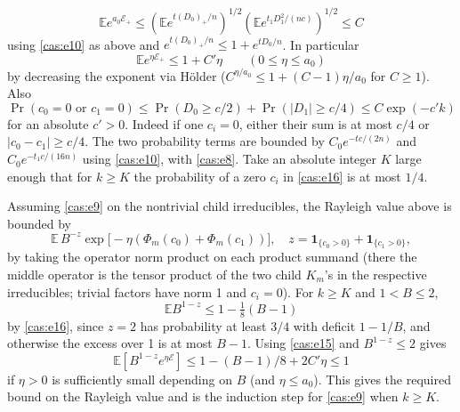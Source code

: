 \[
\mathbb E e^{a_0\mathcal E_+}
\le (\mathbb E e^{t(D_0)_+/n})^{1/2}
     (\mathbb E e^{t_1 D_1^2/(nc)})^{1/2}\le C
\]
using \eqref{cas:e10} as above and \(e^{t(D_0)_+/n}\le1+e^{tD_0/n}\). In particular
\begin{equation}
\mathbb E e^{\eta\mathcal E_+}\le 1+C'\eta\qquad (0\le\eta\le a_0)
\label{cas:e15}
\end{equation}
by decreasing the exponent via Hölder (\(C^{\eta/a_0}\le1+(C-1)\eta/a_0\) for \(C\ge1\)). Also
\begin{equation}
\Pr(c_0=0\text{ or }c_1=0)\le
\Pr(D_0\ge c/2)+\Pr(|D_1|\ge c/4)
\le C \exp(-c' k)
\label{cas:e16}
\end{equation}
for an absolute \(c'>0\). Indeed if one \(c_i=0\), either their sum is at most \(c/4\) or \(|c_0-c_1|\ge c/4\). The two probability terms are bounded by \(C_0 e^{-t c/(2n)}\) and \(C_0 e^{-t_1 c/(16n)}\) using \eqref{cas:e10}, with \eqref{cas:e8}. Take an absolute integer \(K\) large enough that for \(k\ge K\) the probability of a zero \(c_i\) in \eqref{cas:e16} is at most \(1/4\).

Assuming \eqref{cas:e9} on the nontrivial child irreducibles, the Rayleigh value above is bounded by
\[
\mathbb E\, B^{-z}\exp\big[-\eta(\Phi_m(c_0)+\Phi_m(c_1))\big],
\quad z=\mathbf 1_{\{c_0>0\}}+\mathbf 1_{\{c_1>0\}},
\]
by taking the operator norm product on each product summand (there the middle operator is the tensor product of the two child \(K_m\)'s in the respective irreducibles; trivial factors have norm 1 and \(c_i=0\)). For \(k\ge K\) and \(1<B\le2\),
\[
\mathbb E B^{1-z}\le 1-\tfrac18(B-1)
\]
by \eqref{cas:e16}, since \(z=2\) has probability at least \(3/4\) with deficit \(1-1/B\), and otherwise the excess over 1 is at most \(B-1\). Using \eqref{cas:e15} and \(B^{1-z}\le2\) gives
\[
\mathbb E[B^{1-z} e^{\eta\mathcal E}]\le 1-(B-1)/8+2 C'\eta\le1
\]
if \(\eta>0\) is sufficiently small depending on \(B\) (and \(\eta\le a_0\)). This gives the required bound on the Rayleigh value and is the induction step for \eqref{cas:e9} when \(k\ge K\).

